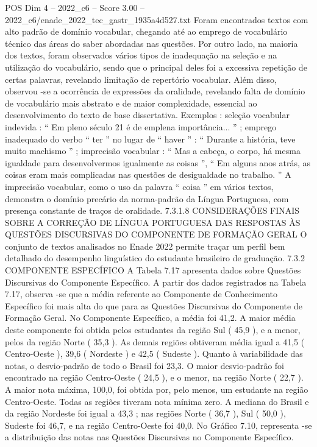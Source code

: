 \begin{textsample}{POS Dim 4 – 2022\_c6 – Score 3.00 – 2022\_c6/enade\_2022\_tec\_gastr\_1935a4d527.txt}
Foram encontrados textos com alto padrão de domínio vocabular, chegando até ao emprego de vocabulário técnico das áreas do saber abordadas nas questões.
Por outro lado, na maioria dos textos, foram observados vários tipos de inadequação na seleção e na utilização do vocabulário, sendo que o principal deles foi a excessiva repetição de certas palavras, revelando limitação de repertório vocabular.
Além disso, observou -se a ocorrência de expressões da oralidade, revelando falta de domínio de vocabulário mais abstrato e de maior complexidade, essencial ao desenvolvimento do texto de base dissertativa.
Exemplos : seleção vocabular indevida : “ Em pleno século 21 é de emplena importância... ” ; emprego inadequado do verbo “ ter ” no lugar de “ haver ” : “ Durante a história, teve muito machismo ” ; imprecisão vocabular : “ Mas a cabeça, o corpo, há mesma igualdade para desenvolvermos igualmente as coisas ”, “ Em alguns anos atrás, as coisas eram mais complicadas nas questões de desigualdade no trabalho. ” A imprecisão vocabular, como o uso da palavra “ coisa ” em vários textos, demonstra o domínio precário da norma-padrão da Língua Portuguesa, com presença constante de traços de oralidade. 7.3.1.8 CONSIDERAÇÕES FINAIS SOBRE A CORREÇÃO DE LÍNGUA PORTUGUESA DAS RESPOSTAS ÀS QUESTÕES DISCURSIVAS DO COMPONENTE DE FORMAÇÃO GERAL O conjunto de textos analisados no Enade 2022 permite traçar um perfil bem detalhado do desempenho linguístico do estudante brasileiro de graduação. 7.3.2 COMPONENTE ESPECÍFICO A Tabela 7.17 apresenta dados sobre Questões Discursivas do Componente Específico.
A partir dos dados registrados na Tabela 7.17, observa -se que a média referente ao Componente de Conhecimento Específico foi mais alta do que para as Questões Discursivas do Componente de Formação Geral.
No Componente Específico, a média foi 41,2.
A maior média deste componente foi obtida pelos estudantes da região Sul ( 45,9 ), e a menor, pelos da região Norte ( 35,3 ).
As demais regiões obtiveram média igual a 41,5 ( Centro-Oeste ), 39,6 ( Nordeste ) e 42,5 ( Sudeste ).
Quanto à variabilidade das notas, o desvio-padrão de todo o Brasil foi 23,3.
O maior desvio-padrão foi encontrado na região Centro-Oeste ( 24,5 ), e o menor, na região Norte ( 22,7 ).
A maior nota máxima, 100,0, foi obtida por, pelo menos, um estudante na região Centro-Oeste.
Todas as regiões tiveram nota mínima zero.
A mediana do Brasil e da região Nordeste foi igual a 43,3 ; nas regiões Norte ( 36,7 ), Sul ( 50,0 ), Sudeste foi 46,7, e na região Centro-Oeste foi 40,0.
No Gráfico 7.10, representa -se a distribuição das notas nas Questões Discursivas no Componente Específico.

\end{textsample}
